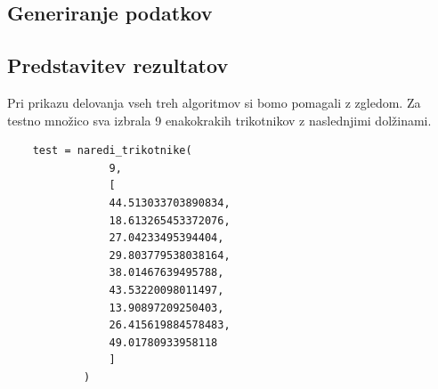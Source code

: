\documentclass[a4paper,12pt]{article}
\theoremstyle{definition}
\theoremstyle{plain}
\begin{document}
\subsection{Generiranje podatkov}

\newpage

\subsection{Predstavitev rezultatov}
Pri prikazu delovanja vseh treh algoritmov si bomo pomagali z zgledom.
Za testno množico sva izbrala 9 enakokrakih trikotnikov z naslednjimi dolžinami.

\begin{verbatim}
    test = naredi_trikotnike(
                9,
                [ 
                44.513033703890834,
                18.613265453372076,
                27.04233495394404,
                29.803779538038164,
                38.01467639495788,
                43.53220098011497,
                13.90897209250403,
                26.415619884578483,
                49.01780933958118
                ]
            )
\end{verbatim}
\end{document}
